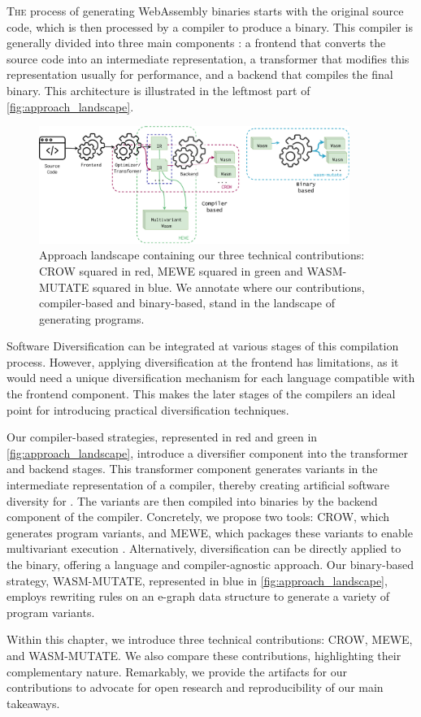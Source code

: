 
\lettrine[lines=3]{T}{he} process of generating WebAssembly binaries starts with the original source code, which is then processed by a compiler to produce a \Wasm binary. 
This compiler is generally divided into three main components \cite{10.5555/6448}: a frontend that converts the source code into an intermediate representation, a transformer that modifies this representation usually for performance, and a backend that compiles the final \Wasm binary.
This architecture is illustrated in the leftmost part of \autoref{fig:approach_landscape}.

\begin{figure}[h]
	\centering
	\includegraphics[width=0.9\textwidth]{figures/landscape.pdf}
	\caption{Approach landscape containing our three technical contributions: CROW squared in red, MEWE squared in green and WASM-MUTATE squared in blue. We annotate where our contributions, compiler-based and binary-based, stand in the landscape of generating \Wasm programs.}
	\label{fig:approach_landscape}
\end{figure}

Software Diversification can be integrated at various stages of this compilation process. 
However, applying diversification at the frontend has limitations, as it would need a unique diversification mechanism for each language compatible with the frontend component. 
This makes the later stages of the compilers an ideal point for introducing practical \wasm diversification techniques.

Our compiler-based strategies, represented in red and green in \autoref{fig:approach_landscape}, introduce a diversifier component into the transformer and backend stages. 
This transformer component generates variants in the intermediate representation of a compiler, thereby creating artificial software diversity for \Wasm. 
The variants are then compiled into \Wasm binaries by the backend component of the compiler.
Concretely, we propose two tools: CROW, which generates \Wasm program variants, and MEWE, which packages these variants to enable multivariant execution \cite{cox06}.
Alternatively, diversification can be directly applied to the \Wasm binary, offering a language and compiler-agnostic approach. 
Our binary-based strategy, WASM-MUTATE, represented in blue in \autoref{fig:approach_landscape}, employs rewriting rules on an e-graph data structure to generate a variety of \Wasm program variants.

Within this chapter, we introduce three technical contributions: CROW, MEWE, and WASM-MUTATE.
We also compare these contributions, highlighting their complementary nature.
Remarkably, we provide the artifacts for our contributions to advocate for open research and reproducibility of our main takeaways.

\renewcommand{\tool}{CROW\xspace}